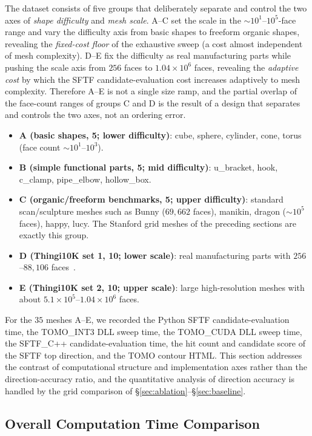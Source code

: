 \documentclass[11pt,a4paper]{article}
\begin{document}
The dataset consists of five groups that deliberately separate and control the two axes of \emph{shape difficulty} and \emph{mesh scale}.
A--C set the scale in the $\sim$$10^1$--$10^5$-face range and vary the difficulty axis from basic shapes to freeform organic shapes,
revealing the \emph{fixed-cost floor} of the exhaustive sweep (a cost almost independent of mesh complexity).
D--E fix the difficulty as real manufacturing parts while pushing the scale axis from $256$ faces to $1.04\times10^6$ faces,
revealing the \emph{adaptive cost} by which the SFTF candidate-evaluation cost increases adaptively to mesh complexity.
Therefore A--E is not a single size ramp, and the partial overlap of the face-count ranges of groups C and D
is the result of a design that separates and controls the two axes, not an ordering error.
\begin{itemize}
\item \textbf{A (basic shapes, 5; lower difficulty)}: cube, sphere, cylinder, cone, torus (face count $\sim$$10^1$--$10^3$).
\item \textbf{B (simple functional parts, 5; mid difficulty)}: u\_bracket, hook, c\_clamp, pipe\_elbow, hollow\_box.
\item \textbf{C (organic/freeform benchmarks, 5; upper difficulty)}: standard scan/sculpture meshes such as Bunny ($69{,}662$ faces), manikin, dragon ($\sim$$10^5$ faces), happy, lucy. The Stanford grid meshes of the preceding sections are exactly this group.
\item \textbf{D (Thingi10K set 1, 10; lower scale)}: real manufacturing parts with $256$--$88{,}106$ faces~\cite{Thingi10K}.
\item \textbf{E (Thingi10K set 2, 10; upper scale)}: large high-resolution meshes with about $5.1\times10^5$--$1.04\times10^6$ faces.
\end{itemize}
For the $35$ meshes A--E, we recorded the Python SFTF candidate-evaluation time,
the TOMO\_INT3 DLL sweep time, the TOMO\_CUDA DLL sweep time, the SFTF\_C++ candidate-evaluation time,
the hit count and candidate score of the SFTF top direction, and the TOMO contour HTML.
This section addresses the contrast of computational structure and implementation axes rather than the direction-accuracy ratio,
and the quantitative analysis of direction accuracy is handled by the grid comparison of \S\ref{sec:ablation}--\S\ref{sec:baseline}.

\subsection{Overall Computation Time Comparison}
\end{document}
